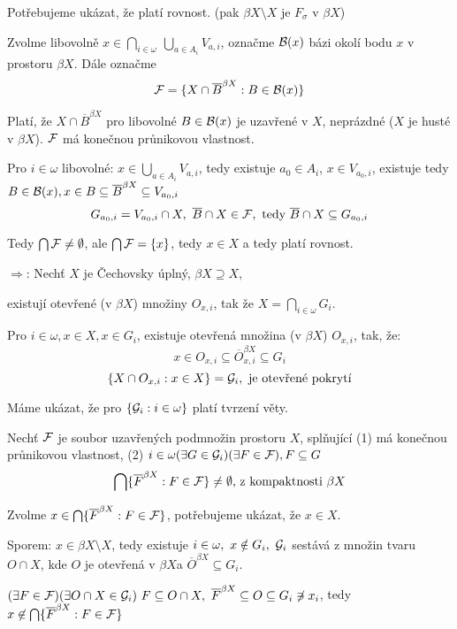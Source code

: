 \documentclass[12pt,a4paper]{article}
\newcommand\BX{$\beta X$}
\newcommand\close{\overline}
\newcommand{\betaClose}[1]{\close #1 ^{\beta X}}
\begin{document}
	Potřebujeme ukázat, že platí rovnost. (pak $\beta X \setminus X$ je
	$F_\sigma$ v \BX)

	Zvolme libovolně $x \in \bigcap_{i \in \omega}~\bigcup_{a \in A_i}
	V_{a,i}$, označme $\mathcal{ B }(x)$ bázi okolí bodu $x$ v prostoru \BX. Dále
	označme
		$$\p F = \{X \cap \betaClose B : B \in \p B(x)\}$$
	
	Platí, že $X \cap \betaClose B$ pro libovolné $B \in \mathcal{ B }(x)$ je
	uzavřené v $X$, neprázdné ($X$ je husté v \BX). $\mathcal{ F }$ má konečnou
	průnikovou vlastnost.

	Pro $i \in \omega$ libovolné: $x \in \bigcup_{a \in A_i} V_{a,i}$, tedy
	existuje $a_0 \in A_i$, $x \in V_{a_0,i}$, existuje tedy $B \in \p B(x), x
	\in B \subseteq \betaClose B \subseteq V_{a_0,i}$
		$$G_{a_0,i} = V_{a_0,i} \cap X,~\close B \cap X \in \p F,~
		  \text{tedy } \close B \cap X \subseteq G_{a_0,i}$$

	Tedy $\bigcap \mathcal{ F } \neq \emptyset$, ale $\bigcap \mathcal{ F } = \{x\}$, tedy $x
	\in X$ a tedy platí rovnost.


\medskip\noindent$\Rightarrow$: Nechť $X$ je Čechovsky úplný, $\beta X \supseteq X$,

	existují otevřené (v \BX) množiny $O_{x,i}$, tak že $X = \bigcap_{i \in
	\omega} G_i$.

	Pro $i \in \omega, x \in X, x \in G_i$, existuje otevřená množina (v \BX)
	$O_{x,i}$, tak, že:
		$$x \in O_{x,i} \subseteq \betaClose O_{x,i} \subseteq G_i$$
		$$\{X \cap O_{x,i} : x \in X\} = \mathcal{ G }_i,~\text{je otevřené pokrytí}$$

	Máme ukázat, že pro $\{\mathcal{ G }_i : i \in \omega \}$ platí tvrzení věty.

	Nechť $\mathcal{ F }$ je soubor uzavřených podmnožin prostoru $X$, splňující (1) má
	konečnou průnikovou vlastnost, (2) $i \in \omega (\exists G \in \mathcal{ G }_i)
	(\exists F \in \mathcal{ F }), F \subseteq G$
		$$\bigcap \{\betaClose F : F \in \p F\} \neq \emptyset \text{, z
		  kompaktnosti } \beta X$$

	Zvolme $x \in \bigcap \{\betaClose F : F \in \p F\}$, potřebujeme ukázat,
	že $x \in X$.

	Sporem: $x \in \beta X \setminus X$, tedy existuje $i \in \omega,~x \notin
	G_i,~\mathcal{ G }_i$ sestává z množin tvaru $O \cap X$, kde $O$ je otevřená v \BX a
	$\betaClose O \subseteq G_i$.

	$(\exists F \in \p F) (\exists O \cap X \in \p G_i)~F \subseteq O \cap X,~
	\betaClose F \subseteq O \subseteq G_i \not\ni x_i$, tedy $x \not\in
	\bigcap \{\betaClose F : F \in \p F\}$
\end{document}
